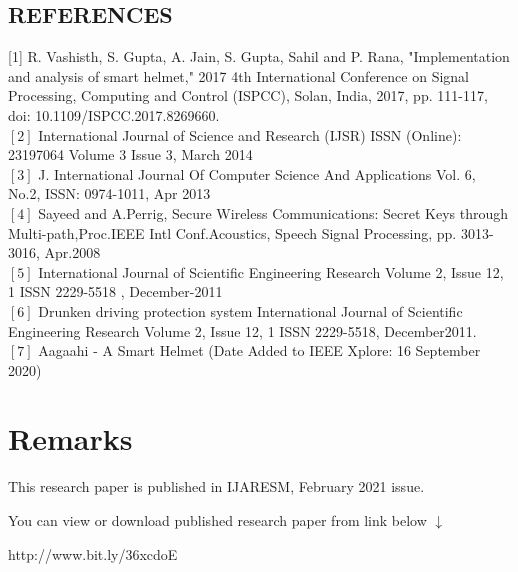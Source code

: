 \section*{REFERENCES}

[1] R. Vashisth, S. Gupta, A. Jain, S. Gupta, Sahil and P. Rana, "Implementation and analysis of smart helmet," 2017 4th International Conference on Signal Processing, Computing and Control (ISPCC), Solan, India, 2017, pp. 111-117, doi: 10.1109/ISPCC.2017.8269660.\\ 
$[2]$ International Journal of Science and Research (IJSR) ISSN (Online): 23197064 Volume 3 Issue 3, March 2014 \\
$[3]$ J. International Journal Of Computer Science And Applications Vol. 6, No.2, ISSN: 0974-1011, Apr 2013 \\
$[4]$ Sayeed and A.Perrig, Secure Wireless Communications: Secret Keys through Multi-path,Proc.IEEE Intl Conf.Acoustics, Speech Signal Processing, pp. 3013-3016, Apr.2008 \\
$[5]$ International Journal of Scientific Engineering Research Volume 2, Issue 12, 1 ISSN 2229-5518 , December-2011 \\
$[6]$ Drunken driving protection system International Journal of Scientific Engineering Research Volume 2, Issue 12, 1 ISSN 2229-5518, December2011.\\
$[7]$ Aagaahi - A Smart Helmet (Date Added to IEEE Xplore: 16 September 2020) \\

\chapter*{Remarks}

This research paper is published in IJARESM,  February 2021 issue.


\vspace{.3cm}

\begin{flushleft}
	You can view or download published research paper from link below $\downarrow$\\
\end{flushleft}
http://www.bit.ly/36xcdoE
